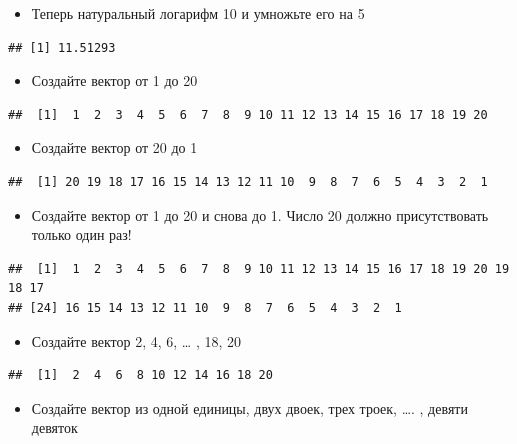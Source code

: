 \documentclass[]{book}
\providecommand{\tightlist}{%
  \setlength{\itemsep}{0pt}\setlength{\parskip}{0pt}}
\begin{document}
\begin{itemize}
\tightlist
\item
  Теперь натуральный логарифм 10 и умножьте его на 5
\end{itemize}

\begin{verbatim}
## [1] 11.51293
\end{verbatim}

\begin{itemize}
\tightlist
\item
  Создайте вектор от 1 до 20
\end{itemize}

\begin{verbatim}
##  [1]  1  2  3  4  5  6  7  8  9 10 11 12 13 14 15 16 17 18 19 20
\end{verbatim}

\begin{itemize}
\tightlist
\item
  Создайте вектор от 20 до 1
\end{itemize}

\begin{verbatim}
##  [1] 20 19 18 17 16 15 14 13 12 11 10  9  8  7  6  5  4  3  2  1
\end{verbatim}

\begin{itemize}
\tightlist
\item
  Создайте вектор от 1 до 20 и снова до 1. Число 20 должно присутствовать только один раз!
\end{itemize}

\begin{verbatim}
##  [1]  1  2  3  4  5  6  7  8  9 10 11 12 13 14 15 16 17 18 19 20 19 18 17
## [24] 16 15 14 13 12 11 10  9  8  7  6  5  4  3  2  1
\end{verbatim}

\begin{itemize}
\tightlist
\item
  Создайте вектор 2, 4, 6, \ldots{} , 18, 20
\end{itemize}

\begin{verbatim}
##  [1]  2  4  6  8 10 12 14 16 18 20
\end{verbatim}

\begin{itemize}
\tightlist
\item
  Создайте вектор из одной единицы, двух двоек, трех троек, \ldots. , девяти девяток
\end{itemize}
\end{document}

